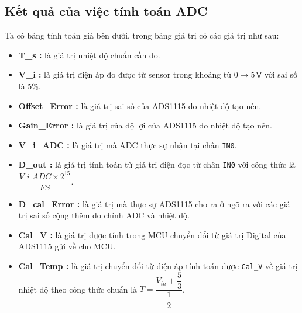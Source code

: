 \subsection{Kết quả của việc tính toán ADC}

Ta có bảng tính toán giá bên dưới, trong bảng giá trị có các giá trị như sau:

\begin{itemize}[label=-]
	\item \textbf{T\_s :} là giá trị nhiệt độ chuẩn cần đo.
	\item \textbf{V\_i :} là giá trị điện áp đo được từ sensor trong khoảng từ $0\rightarrow 5\,\textsf{V}$ với sai số là 5\%.
	\item \textbf{Offset\_Error :} là giá trị sai số của ADS1115 do nhiệt độ tạo nên.
	\item \textbf{Gain\_Error :} là giá trị của độ lợi của ADS1115 do nhiệt độ tạo nên.
	\item \textbf{V\_i\_ADC :} là giá trị mà ADC thực sự nhận tại chân \texttt{IN0}.
	\item \textbf{D\_out :} là giá trị tính toán từ giá trị điện đọc từ chân \texttt{IN0} với công thức là $\dfrac{V\_i\_ADC \times 2^{15}}{FS}$.
	\item \textbf{D\_cal\_Error :} là giá trị mà thực sự ADS1115 cho ra ở ngõ ra với các giá trị sai số cộng thêm do chính ADC và nhiệt độ.
	\item \textbf{Cal\_V :} là giá trị được tính trong MCU chuyển đổi từ giá trị Digital của ADS1115 gửi về cho MCU.
	\item \textbf{Cal\_Temp :} là giá trị chuyển đổi từ điện áp tính toán được \texttt{Cal\_V} về giá trị nhiệt độ theo công thức chuẩn là $T = \dfrac{V_{in} + \dfrac{5}{3}}{\dfrac{1}{2}}$.
\end{itemize}

\begin{landscape}
	
\end{landscape}